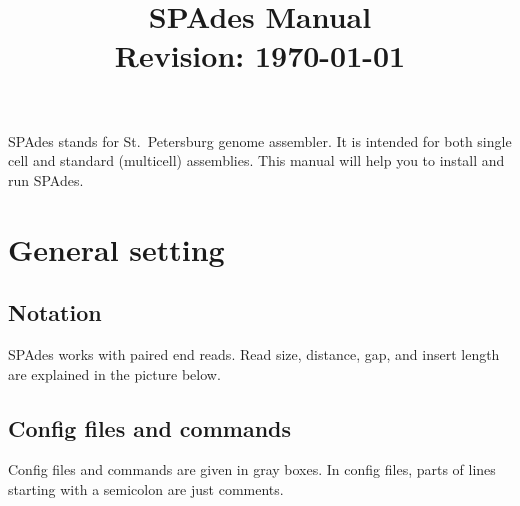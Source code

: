 \documentclass{article}
\def\spades{SPAdes}
\begin{document}
\title{{\spades} Manual\\{\small Revision: \today}}
\date{}
\maketitle

{\spades} stands for St.~Petersburg genome assembler.
It is intended for both single cell and standard (multicell) 
assemblies. This manual will help you to install and run
{\spades}.



\renewcommand{\contentsname}{}
\tableofcontents



\pagebreak

\section{General setting}
\subsection{Notation}
{\spades} works with paired end reads.
Read size, distance, gap, and insert length are 
explained in the picture below.

\begin{center}
\end{center}

\subsection{Config files and commands}
Config files and commands are given in gray boxes. 
In config files, parts of lines starting with a semicolon are just comments.
\end{document}
